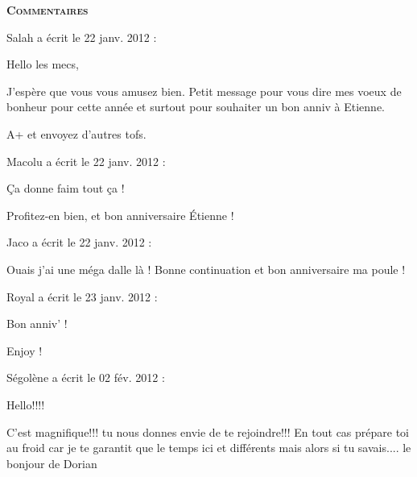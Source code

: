 \bigskip
\textbf{\textsc{Commentaires}}

\medskip
Salah  a écrit le 22 janv. 2012 :
\begin{displayquote}
Hello les mecs,

J'espère que vous vous amusez bien. Petit message pour vous dire mes voeux de bonheur pour cette année et surtout pour souhaiter un bon anniv à Etienne.

A+ et envoyez d'autres tofs.
\end{displayquote}

\medskip
Macolu a écrit le 22 janv. 2012 :
\begin{displayquote}
Ça donne faim tout ça !

Profitez-en bien, et bon anniversaire Étienne !
\end{displayquote}

\medskip
Jaco a écrit le 22 janv. 2012 :
\begin{displayquote}
Ouais j'ai une méga dalle là !
Bonne continuation et bon anniversaire ma poule !
\end{displayquote}

\medskip
Royal a écrit le 23 janv. 2012 :
\begin{displayquote}
Bon anniv' !

Enjoy !
\end{displayquote}

\medskip
Ségolène a écrit le 02 fév. 2012 :
\begin{displayquote}
Hello!!!!

C'est magnifique!!! tu nous donnes envie de te rejoindre!!!
En tout cas prépare toi au froid car je te garantit que le temps ici et différents mais alors si tu savais....
le bonjour de Dorian
\end{displayquote}

